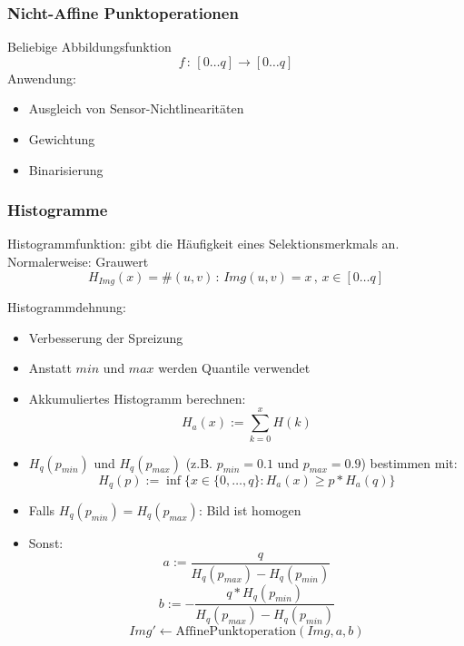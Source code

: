 \subsubsection*{Nicht-Affine Punktoperationen}

Beliebige Abbildungsfunktion $$f \, : \, [0 \dots q] \to [0 \dots q]$$
Anwendung:
\begin{itemize}
\item Ausgleich von Sensor-Nichtlinearitäten
\item Gewichtung
\item Binarisierung
\end{itemize}

\subsubsection*{Histogramme}

Histogrammfunktion: gibt die Häufigkeit eines Selektionsmerkmals an. Normalerweise: Grauwert
$$H_{Img}(x) = \# (u,v) \, : \, Img(u,v) = x \, , \, x \in [0 \dots q]$$

Histogrammdehnung:
\begin{itemize}
\item Verbesserung der Spreizung
\item Anstatt $min$ und $max$ werden Quantile verwendet
\item Akkumuliertes Histogramm berechnen: \[H_a(x):=\sum\limits_{k=0}^x H(k)\]
\item \(H_q(p_{min})\) und \(H_q(p_{max})\) (z.B. \(p_{min} = 0.1\) und \(p_{max} = 0.9\)) bestimmen mit: \[H_q(p) := \inf\{ x \in \{ 0, \dots ,q\}:H_a(x) \geq p*H_a(q) \}\]
\item Falls \(H_q(p_{min}) = H_q(p_{max})\): Bild ist homogen
\item Sonst:
\[ a:=\frac{q}{H_q(p_{max}) - H_q(p_{min})} \]
\[ b:=-\frac{q*H_q(p_{min})}{H_q(p_{max}) - H_q(p_{min})} \]
\[ Img' \gets \text{AffinePunktoperation}(Img,a,b) \]
\end{itemize}

